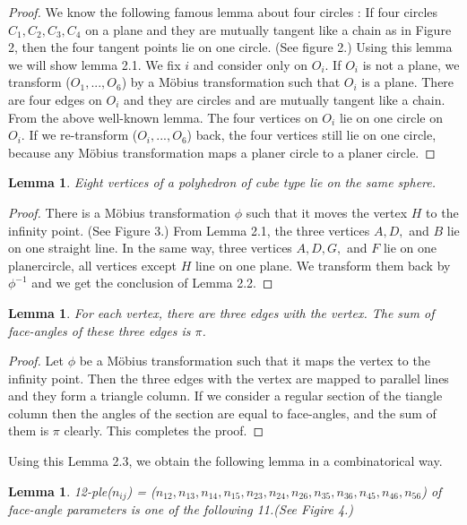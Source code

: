 \documentclass[dvipdfmx]{interact}
\theoremstyle{plain}%
\newtheorem{lemma}[theorem]{Lemma}
\theoremstyle{definition}
\theoremstyle{remark}
\theoremstyle{problemstyle}
\begin{document}
\begin{proof}
 We know the following famous lemma about four circles : If four circles 
 $C_1, C_2, C_3, C_4$ on a plane and they are mutually tangent like a
 chain as in Figure 2, then the four tangent points lie on one circle.
 (See figure 2.) Using this lemma we will show lemma 2.1. We fix $i$ and
 consider only on $O_i$. If $O_i$ is not a plane, we transform 
 ($O_1, ..., O_6$) by a M\"obius transformation such that $O_i$ is a
 plane. There are four edges on $O_i$ and they are circles and are
 mutually tangent like a chain. From the above well-known lemma. The
 four vertices on $O_i$ lie on one circle on $O_i$. If we re-transform
 ($O_i, ..., O_6$) back, the four vertices still lie on one circle,
 because any M\"obius transformation maps a planer circle to a planer circle.
\end{proof}

\begin{lemma}
 Eight vertices of a polyhedron of cube type lie on the same sphere.
\end{lemma}

\begin{proof}
 There is a M\"obius transformation $\phi$ such that it moves the vertex
 $H$ to the infinity point. (See Figure 3.) From Lemma 2.1, the three
 vertices $A, D,$ and $B$ lie on one straight line. In the same way,
 three vertices $A, D, G,$ and $F$ lie on one planercircle, all vertices
 except $H$ line on one plane. We transform them back by $\phi^{-1}$ and
 we get the conclusion of Lemma 2.2.
\end{proof}

\begin{lemma}
 For each vertex, there are three edges with the vertex. The sum of
 face-angles of these three edges is $\pi$.
\end{lemma}

\begin{proof}
 Let $\phi$ be a M\"obius transformation such that it maps the vertex to
 the infinity point. Then the three edges with the vertex are mapped to
 parallel lines and they form a triangle column. If we consider a
 regular section of the tiangle column then the angles of the section
 are equal to face-angles, and the sum of them is $\pi$ clearly. This
 completes the proof.
\end{proof}

 Using this Lemma 2.3, we obtain the following lemma in a combinatorical way.

\begin{lemma}
 12-ple($n_{ij}$) = ($n_{12}, n_{13}, n_{14}, n_{15}, n_{23}, n_{24},
 n_{26}, n_{35}, n_{36}, n_{45}, n_{46}, n_{56}$) of face-angle
 parameters is one of the following 11.(See Figire 4.)
\end{lemma}
\end{document}
